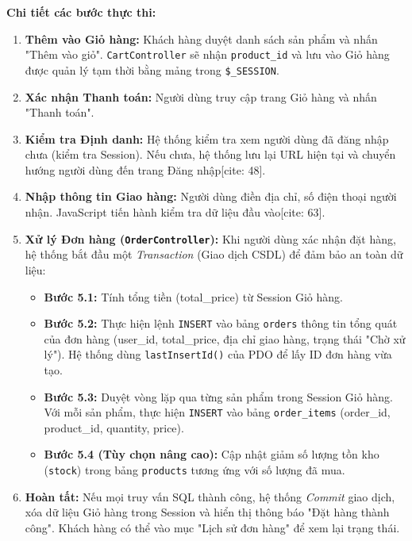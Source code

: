 
\textbf{Chi tiết các bước thực thi:}
\begin{enumerate}
    \item \textbf{Thêm vào Giỏ hàng:} Khách hàng duyệt danh sách sản phẩm và nhấn "Thêm vào giỏ". \texttt{CartController} sẽ nhận \texttt{product\_id} và lưu vào Giỏ hàng được quản lý tạm thời bằng mảng trong \texttt{\$\_SESSION}.
    \item \textbf{Xác nhận Thanh toán:} Người dùng truy cập trang Giỏ hàng và nhấn "Thanh toán".
    \item \textbf{Kiểm tra Định danh:} Hệ thống kiểm tra xem người dùng đã đăng nhập chưa (kiểm tra Session). Nếu chưa, hệ thống lưu lại URL hiện tại và chuyển hướng người dùng đến trang Đăng nhập[cite: 48].
    \item \textbf{Nhập thông tin Giao hàng:} Người dùng điền địa chỉ, số điện thoại người nhận. JavaScript tiến hành kiểm tra dữ liệu đầu vào[cite: 63].
    \item \textbf{Xử lý Đơn hàng (\texttt{OrderController}):} Khi người dùng xác nhận đặt hàng, hệ thống bắt đầu một \textit{Transaction} (Giao dịch CSDL) để đảm bảo an toàn dữ liệu:
    \begin{itemize}
        \item \textbf{Bước 5.1:} Tính tổng tiền (total\_price) từ Session Giỏ hàng.
        \item \textbf{Bước 5.2:} Thực hiện lệnh \texttt{INSERT} vào bảng \texttt{orders} thông tin tổng quát của đơn hàng (user\_id, total\_price, địa chỉ giao hàng, trạng thái "Chờ xử lý"). Hệ thống dùng \texttt{lastInsertId()} của PDO để lấy ID đơn hàng vừa tạo.
        \item \textbf{Bước 5.3:} Duyệt vòng lặp qua từng sản phẩm trong Session Giỏ hàng. Với mỗi sản phẩm, thực hiện \texttt{INSERT} vào bảng \texttt{order\_items} (order\_id, product\_id, quantity, price).
        \item \textbf{Bước 5.4 (Tùy chọn nâng cao):} Cập nhật giảm số lượng tồn kho (\texttt{stock}) trong bảng \texttt{products} tương ứng với số lượng đã mua.
    \end{itemize}
    \item \textbf{Hoàn tất:} Nếu mọi truy vấn SQL thành công, hệ thống \textit{Commit} giao dịch, xóa dữ liệu Giỏ hàng trong Session và hiển thị thông báo "Đặt hàng thành công". Khách hàng có thể vào mục "Lịch sử đơn hàng" để xem lại trạng thái.
\end{enumerate}